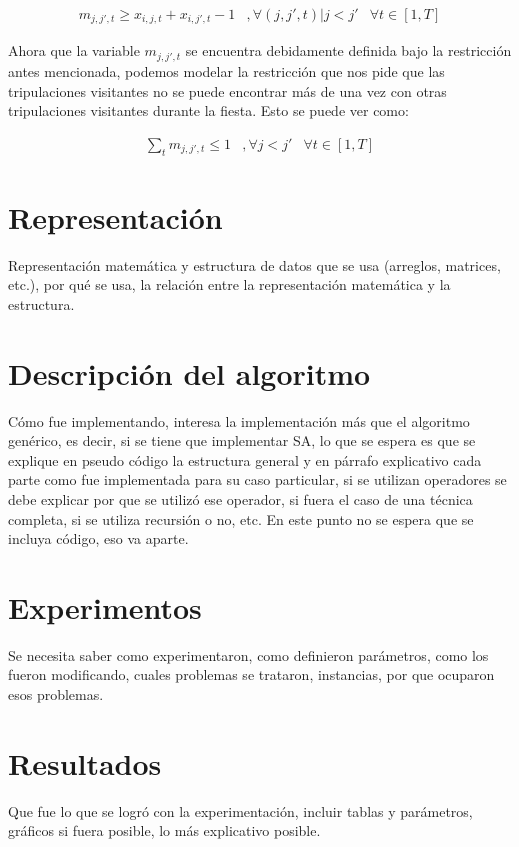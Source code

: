 \documentclass[letter, 10pt]{article}
\begin{document}
\begin{eqnarray}
m_{j,j',t} \geq x_{i,j,t} + x_{i,j',t} - 1 & , \forall(j,j',t)|j<j'& \forall t \in [1,T]
\end{eqnarray}

Ahora que la variable $m_{j,j',t}$ se encuentra debidamente definida bajo la restricción antes mencionada, podemos modelar la restricción que nos pide que las tripulaciones visitantes no se puede encontrar más de una vez con otras tripulaciones visitantes durante la fiesta. Esto se puede ver como:

\begin{eqnarray}
\sum_t m_{j,j',t} \leq 1 & , \forall j<j'& \forall t \in [1,T]
\end{eqnarray}

\section{Representación}
Representaci\'on matem\'atica y estructura de datos que se usa (arreglos, matrices, etc.), por qu\'e se usa, la relaci\'on entre la 
representaci\'on matem\'atica y la estructura.

\section{Descripción del algoritmo}
C\'omo fue implementando, interesa la implementaci\'on m\'as que el algoritmo gen\'erico, es decir,
si se tiene que implementar SA, lo que se espera es que se explique en pseudo c\'odigo la estructura
general y en p\'arrafo explicativo cada parte como fue implementada para su caso particular, si
se utilizan operadores se debe explicar por que se utiliz\'o ese operador, si fuera el caso de una
t\'ecnica completa, si se utiliza recursi\'on o no, etc. En este punto no se espera que se incluya
c\'odigo, eso va aparte.

\section{Experimentos}
Se necesita saber como experimentaron, como definieron par\'ametros, como los fueron modificando, cuales 
problemas se trataron, instancias, por que ocuparon esos problemas.

\section{Resultados}
Que fue lo que se logr\'o con la experimentaci\'on, incluir tablas y par\'ametros, gr\'aficos si fuera
posible, lo m\'as explicativo posible.
\end{document}
